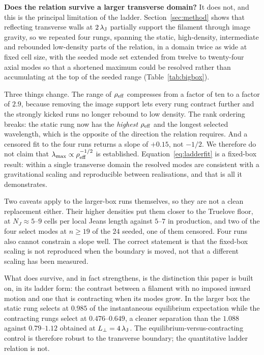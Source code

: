 \documentclass[usenatbib,twoside,twocolumn]{mnras}
\begin{document}
\smallskip\noindent\textbf{Does the relation survive a larger transverse domain?} It does not, and this is the principal limitation of the ladder. Section~\ref{sec:method} shows that reflecting transverse walls at $2\,\lambda_{\rm J}$ partially support the filament through image gravity, so we repeated four rungs, spanning the static, high-density, intermediate and rebounded low-density parts of the relation, in a domain twice as wide at fixed cell size, with the seeded mode set extended from twelve to twenty-four axial modes so that a shortened maximum could be resolved rather than accumulating at the top of the seeded range (Table~\ref{tab:bigbox}).

Three things change. The range of $\rho_{\rm eff}$ compresses from a factor of ten to a factor of $2.9$, because removing the image support lets every rung contract further and the strongly kicked runs no longer rebound to low density. The rank ordering breaks: the static rung now has the \emph{highest} $\rho_{\rm eff}$ and the longest selected wavelength, which is the opposite of the direction the relation requires. And a censored fit to the four runs returns a slope of $+0.15$, not $-1/2$. We therefore do not claim that $\lambda_{\rm max}\propto\rho_{\rm eff}^{-1/2}$ is established. Equation~\ref{eq:ladderfit} is a fixed-box result: within a single transverse domain the resolved modes are consistent with a gravitational scaling and reproducible between realisations, and that is all it demonstrates.

Two caveats apply to the larger-box runs themselves, so they are not a clean replacement either. Their higher densities put them closer to the Truelove floor, at $N_J\approx5$--$9$ cells per local Jeans length against $5$--$7$ in production, and two of the four select modes at $n\geq19$ of the $24$ seeded, one of them censored. Four runs also cannot constrain a slope well. The correct statement is that the fixed-box scaling is not reproduced when the boundary is moved, not that a different scaling has been measured.

What does survive, and in fact strengthens, is the distinction this paper is built on, in its ladder form: the contrast between a filament with no imposed inward motion and one that is contracting when its modes grow. In the larger box the static rung selects at $0.985$ of the instantaneous equilibrium expectation while the contracting rungs select at $0.476$--$0.649$, a cleaner separation than the $1.088$ against $0.79$--$1.12$ obtained at $L_\perp=4\,\lambda_{\rm J}$. The equilibrium-versus-contracting control is therefore robust to the transverse boundary; the quantitative ladder relation is not.
\end{document}
